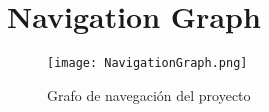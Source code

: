 \section{Navigation Graph}

\begin{figure}[H]
	\centering
	\texttt{[image: NavigationGraph.png]}
	\caption{Grafo de navegación del proyecto}
\end{figure}
